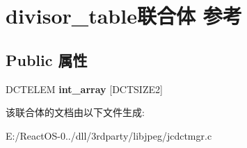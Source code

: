 \hypertarget{uniondivisor__table}{}\section{divisor\+\_\+table联合体 参考}
\label{uniondivisor__table}
\subsection*{Public 属性}
\begin{DoxyCompactItemize}
\item 
\mbox{\label{uniondivisor__table_a57e8528abf46b37f84205e45bfd86902}} 
D\+C\+T\+E\+L\+EM {\bfseries int\+\_\+array} \mbox{[}D\+C\+T\+S\+I\+Z\+E2\mbox{]}
\end{DoxyCompactItemize}


该联合体的文档由以下文件生成\+:\begin{DoxyCompactItemize}
\item 
E\+:/\+React\+O\+S-\/0../dll/3rdparty/libjpeg/jcdctmgr.\+c\end{DoxyCompactItemize}
